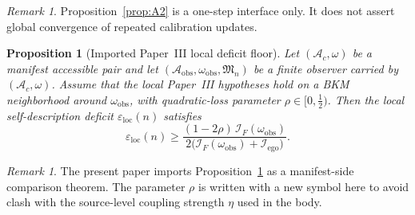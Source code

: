 \documentclass[12pt]{article}
\newtheorem{proposition}[theorem]{Proposition}
\theoremstyle{definition}
\theoremstyle{remark}
\newtheorem{remark}[theorem]{Remark}
\begin{document}
\begin{remark}
Proposition~\ref{prop:A2} is a one-step interface only. It does not
assert global convergence of repeated calibration updates.
\end{remark}

\begin{proposition}[Imported Paper~III local deficit floor]
\label{prop:A3}
Let \((\mathcal A_c,\omega)\) be a manifest accessible pair and let
\((\mathcal A_{\mathrm{obs}},\omega_{\mathrm{obs}},\mathfrak M_n)\) be a
finite observer carried by \((\mathcal A_c,\omega)\). Assume that the
local Paper~III hypotheses hold on a BKM neighborhood around
\(\omega_{\mathrm{obs}}\), with quadratic-loss parameter
\(\rho\in[0,\tfrac12)\). Then the local self-description deficit
\(\varepsilon_{\mathrm{loc}}(n)\) satisfies
\[
\varepsilon_{\mathrm{loc}}(n)
\ge
\frac{(1-2\rho)\,\mathcal I_F(\omega_{\mathrm{obs}})}
{2\bigl(
\mathcal I_F(\omega_{\mathrm{obs}})
+
\mathcal I_{\mathrm{ego}}
\bigr)}.
\]
\end{proposition}

\begin{remark}
The present paper imports Proposition~\ref{prop:A3} as a manifest-side
comparison theorem. The parameter \(\rho\) is written with a new symbol
here to avoid clash with the source-level coupling strength
\(\eta\) used in the body.
\end{remark}

\newpage
{}
\end{document}
